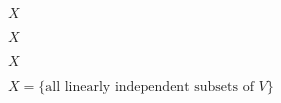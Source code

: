 \documentclass[10pt]{book}
\begin{document}
\begin{mdSnippets}
\begin{mdInlineSnippet}[02129bb861061d1a052c592e2dc6b383]%
$X$\end{mdInlineSnippet}%
\begin{mdInlineSnippet}[02129bb861061d1a052c592e2dc6b383]%
$X$\end{mdInlineSnippet}%
\begin{mdInlineSnippet}[02129bb861061d1a052c592e2dc6b383]%
$X$\end{mdInlineSnippet}%
\begin{mdInlineSnippet}[7941e6f4a6c48fb3cee1cd3345e9d57b]%
$X = \{\text{all linearly independent subsets of }V\}$\end{mdInlineSnippet}%

\end{mdSnippets}
\end{document}
